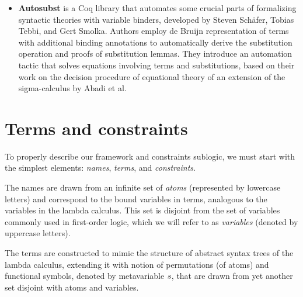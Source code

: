 \documentclass[english, mgr]{iithesis}
\renewcommand{\it}[1]{\textit{#1}}
\begin{document}
\begin{itemize}
\item \textbf{Autosubst}\cite{autosubst}
is a Coq library that automates some crucial parts of formalizing syntactic theories with variable binders,
developed by Steven Schäfer, Tobias Tebbi, and Gert Smolka.
Authors employ de Bruijn representation of terms with additional binding annotations
to automatically derive the substitution operation and proofs of substitution lemmas.
They introduce an automation tactic that solves equations involving terms and substitutions,
based on their work on the decision procedure of equational theory of
an extension of the sigma-calculus by Abadi et al\cite{sigma-calculus}.
\\

\end{itemize}
\chapter{Terms and constraints}
To properly describe our framework and constraints sublogic,
we must start with the simplest elements: \it{names}, \it{terms}, and \it{constraints}.

The names are drawn from an infinite set of \it{atoms} (represented by lowercase letters)
and correspond to the bound variables in terms, analogous to the variables in the lambda calculus.
This set is disjoint from the set of variables commonly used in first-order logic,
which we will refer to as \it{variables} (denoted by uppercase letters).

The terms are constructed to mimic the structure of abstract syntax trees of the lambda calculus,
extending it with notion of permutations (of atoms) and functional symbols,
denoted by metavariable $s$,
that are drawn from yet another set disjoint with atoms and variables.
\end{document}
